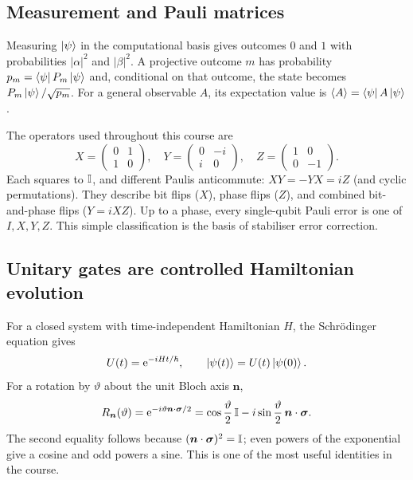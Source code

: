 \subsection{Measurement and Pauli matrices}
Measuring $\left\lvert \psi\right\rangle$ in the computational basis gives outcomes $0$ and $1$ with probabilities $|\alpha|^2$ and $|\beta|^2$. A projective outcome $m$ has probability $p_m=\left\langle \psi\right\rvert P_m\left\lvert \psi\right\rangle$ and, conditional on that outcome, the state becomes $P_m\left\lvert \psi\right\rangle/\sqrt{p_m}$. For a general observable $A$, its expectation value is $\langle A\rangle=\left\langle \psi\right\rvert A\left\lvert \psi\right\rangle$.

The operators used throughout this course are
\begin{equation}\label{eq:pauli}
X=\begin{pmatrix}0&1\\1&0\end{pmatrix},\quad
Y=\begin{pmatrix}0&-i\\i&0\end{pmatrix},\quad
Z=\begin{pmatrix}1&0\\0&-1\end{pmatrix}.
\end{equation}
Each squares to $\mathbb{I}$, and different Paulis anticommute: $XY=-YX=iZ$ (and cyclic permutations). They describe bit flips ($X$), phase flips ($Z$), and combined bit-and-phase flips ($Y=iXZ$). Up to a phase, every single-qubit Pauli error is one of $I,X,Y,Z$. This simple classification is the basis of stabiliser error correction.

\subsection{Unitary gates are controlled Hamiltonian evolution}
For a closed system with time-independent Hamiltonian $H$, the Schr\"odinger equation gives
\begin{equation}\label{eq:unitary}
U(t)=\mathrm{e}^{-iHt/\hbar},\qquad \left\lvert \psi(t)\right\rangle=U(t)\left\lvert \psi(0)\right\rangle.
\end{equation}
For a rotation by $\vartheta$ about the unit Bloch axis $\bm n$,
\begin{equation}\label{eq:rotation}
R_{\bm n}(\vartheta)=\mathrm{e}^{-i\vartheta\bm n\cdot\bm\sigma/2}
=\cos\frac{\vartheta}{2}\,\mathbb{I}-i\sin\frac{\vartheta}{2}\,\bm n\cdot\bm\sigma.
\end{equation}
The second equality follows because $(\bm n\cdot\bm\sigma)^2=\mathbb{I}$; even powers of the exponential give a cosine and odd powers a sine. This is one of the most useful identities in the course.

